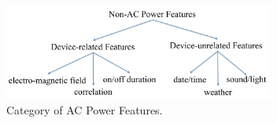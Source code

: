 \begin{figure}[h]
\centering
\includegraphics[width=3.5in]{figs/NonPowerFeatures.pdf}
\caption{Category of AC Power Features.}
\label{fig_NonACPowerFeatures}
\end{figure}
